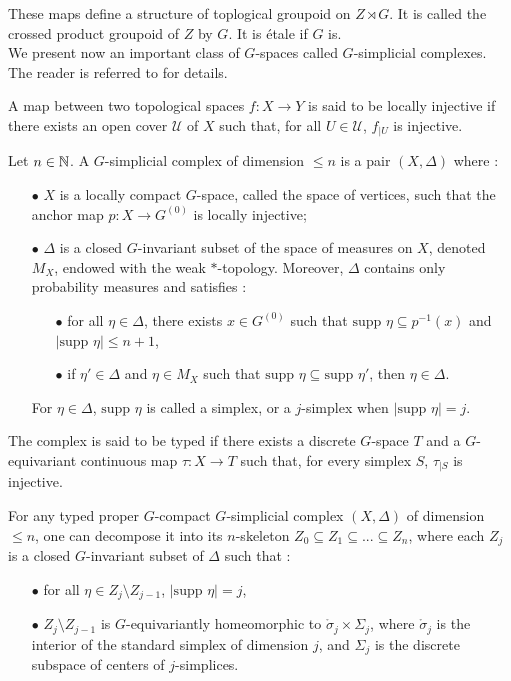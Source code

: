 These maps define a structure of toplogical groupoid on $Z\rtimes G$. It is called the crossed product groupoid of $Z$ by $G$. It is étale if $G$ is.\\

We present now an important class of $G$-spaces called $G$-simplicial complexes. The reader is referred to \cite{TuBC2} for details. 

\begin{definition}
A map between two topological spaces $f : X\rightarrow Y$ is said to be locally injective if there exists an open cover $\mathcal U$ of $X$ such that, for all $U\in \mathcal U$, $f_{|U}$ is injective.
\end{definition}

\begin{definition} \label{Gcomplex}
Let $n\in\mathbb N$. A $G$-simplicial complex of dimension $\leq n$ is a pair $(X,\Delta)$ where :
\begin{itemize}
\item[$\bullet$] $X$ is a locally compact $G$-space, called the space of vertices, such that the anchor map $p : X\rightarrow G^{(0)}$ is locally injective;
\item[$\bullet$] $\Delta$ is a closed $G$-invariant subset of the space of measures on $X$, denoted $M_X$, endowed with the weak $*$-topology. Moreover, $\Delta$ contains only probability measures and satisfies :
\begin{itemize}
\item[$\bullet$] for all $\eta\in\Delta$, there exists $x\in G^ {(0)}$ such that $\text{supp }\eta \subseteq p^{-1}(x)$ and $|\text{supp }\eta|\leq n+1$,
\item[$\bullet$] if $\eta' \in \Delta$ and $\eta\in M_X$ such that $\text{supp }\eta \subseteq \text{supp }\eta'$, then $\eta\in \Delta$.
\end{itemize}
For $\eta\in \Delta$, $\text{supp }\eta$ is called a simplex, or a $j$-simplex when $|\text{supp }\eta | = j$.
\end{itemize}
The complex is said to be typed if there exists a discrete $G$-space $T$ and a $G$-equivariant continuous map $\tau : X\rightarrow T$ such that, for every simplex $S$, $\tau_{|S}$ is injective.  
\end{definition}

For any typed proper $G$-compact $G$-simplicial complex $(X,\Delta)$ of dimension $\leq n$, one can decompose it into its $n$-skeleton $Z_0\subseteq Z_1 \subseteq ... \subseteq Z_n$, where each $Z_j$ is a closed $G$-invariant subset of $\Delta$ such that :
\begin{itemize}
\item[$\bullet$] for all $\eta \in Z_j \setminus Z_{j-1}$, $|\text{supp }\eta|= j$,
\item[$\bullet$] $Z_j \setminus Z_{j-1}$ is $G$-equivariantly homeomorphic to $\mathring\sigma_j \times \Sigma_j$, where $\mathring\sigma_j $ is the interior of the standard simplex of dimension $j$, and $\Sigma_j$ is the discrete subspace of centers of $j$-simplices.
\end{itemize}

